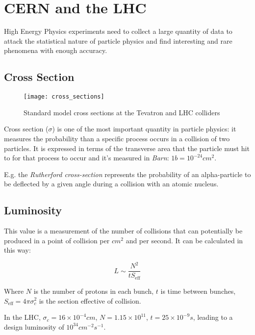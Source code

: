\section{CERN and the LHC}

High Energy Physics experiments need to collect a large quantity of data to attack the statistical nature of particle physics and find interesting and rare phenomena with enough accuracy.

\subsection{Cross Section}

\begin{figure}
	\centerline{
		\texttt{[image: cross\_sections]}}
	\caption{Standard  model  cross  sections  at  the  Tevatron  and  LHC  colliders\cite{Bechtel:2009zza}}
\end{figure}

Cross section ($\sigma$) is one of the most important quantity in particle physics: it measures the probability than a specific process occurs in a collision of two particles. It is expressed in terms of the transverse area that the particle must hit to for that process to occur and it's measured in \textit{Barn}: $1b = 10^{-24} cm^2$.

E.g. the \textit{Rutherford cross-section} represents the probability of an alpha-particle to be deflected by a given angle during a collision with an atomic nucleus.

\subsection{Luminosity}

This value is a measurement of the number of collisions that can potentially be produced in a point of collision per $cm^2$ and per second. It can be calculated in this way:

\begin{equation}
	L\sim \frac{N^2}{t S_{\text{eff}}}
\end{equation}

Where $N$ is the number of protons in each bunch, $t$ is time between bunches, $S_{\text{eff}} = 4 \pi \sigma_c^2$ is the section effective of collision.

In the LHC, $\sigma _c= 16\times 10^{-4} cm$, $N = 1.15\times10^{11}$, $t = 25 \times 10^{-9} s$, leading to a design luminosity of $10^{34} cm^{-2}s^{-1}$.

